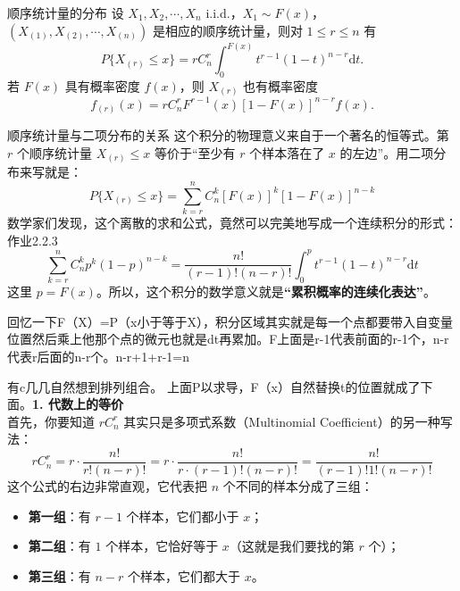 \begin{theorem}{顺序统计量的分布}
    设 $X_1, X_2, \cdots, X_n$ i.i.d.，$X_1 \sim F(x)$，$(X_{(1)}, X_{(2)}, \cdots, X_{(n)})$ 是相应的顺序统计量，则对 $1 \leqslant r \leqslant n$ 有
    \begin{equation}
        P\{X_{(r)} \leqslant x\} = r C_n^r \int_0^{F(x)} t^{r-1}(1-t)^{n-r} \mathrm{d}t. \tag{2.2.1}
    \end{equation}
    若 $F(x)$ 具有概率密度 $f(x)$，则 $X_{(r)}$ 也有概率密度
    \begin{equation}
        f_{(r)}(x) = r C_n^r F^{r-1}(x)[1 - F(x)]^{n-r} f(x). \tag{2.2.2}
    \end{equation}
\end{theorem}
\begin{note}{顺序统计量与二项分布的关系}
这个积分的物理意义来自于一个著名的恒等式。第 $r$ 个顺序统计量 $X_{(r)} \leqslant x$ 等价于“至少有 $r$ 个样本落在了 $x$ 的左边”。用二项分布来写就是：
$$P\{X_{(r)} \leqslant x\} = \sum_{k=r}^n C_n^k [F(x)]^k [1-F(x)]^{n-k}$$
数学家们发现，这个离散的求和公式，竟然可以完美地写成一个连续积分的形式：作业2.2.3
$$\sum_{k=r}^n C_n^k p^k (1-p)^{n-k} = \frac{n!}{(r-1)!(n-r)!} \int_0^p t^{r-1}(1-t)^{n-r} \mathrm{d}t$$
这里 $p = F(x)$。所以，这个积分的数学意义就是\textbf{“累积概率的连续化表达”}。
\end{note}
\begin{dxtips}[学习新公式都要把他拆成几个部分]
    回忆一下F（X）=P（x小于等于X），积分区域其实就是每一个点都要带入自变量位置然后乘上他那个点的微元也就是dt再累加。F上面是r-1代表前面的r-1个，n-r代表r后面的n-r个。n-r+1+r-1=n
\end{dxtips}
\begin{dxtips}
 有c几几自然想到排列组合。   上面P以求导，F（x）自然替换t的位置就成了下面。\textbf{1. 代数上的等价} \\
首先，你要知道 $r C_n^r$ 其实只是多项式系数（Multinomial Coefficient）的另一种写法：
$$r C_n^r = r \cdot \frac{n!}{r!(n-r)!} = r \cdot \frac{n!}{r \cdot (r-1)!(n-r)!} = \frac{n!}{(r-1)! 1! (n-r)!}$$
这个公式的右边非常直观，它代表把 $n$ 个不同的样本分成了三组：
\begin{itemize}
    \item \textbf{第一组}：有 $r-1$ 个样本，它们都小于 $x$；
    \item \textbf{第二组}：有 $1$ 个样本，它恰好等于 $x$（这就是我们要找的第 $r$ 个）；
    \item \textbf{第三组}：有 $n-r$ 个样本，它们都大于 $x$。
\end{itemize}
\end{dxtips}
